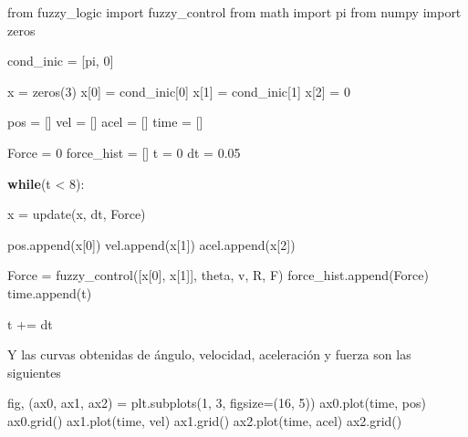 \documentclass[onecolumn]{article}
\newenvironment{Shaded}{}{}
\newcommand{\ControlFlowTok}[1]{\textcolor[rgb]{0.00,0.44,0.13}{\textbf{#1}}}
\newcommand{\DecValTok}[1]{\textcolor[rgb]{0.25,0.63,0.44}{#1}}
\newcommand{\FloatTok}[1]{\textcolor[rgb]{0.25,0.63,0.44}{#1}}
\newcommand{\ImportTok}[1]{#1}
\newcommand{\NormalTok}[1]{#1}
\newcommand{\OperatorTok}[1]{\textcolor[rgb]{0.40,0.40,0.40}{#1}}
\begin{document}
\begin{Shaded}
\begin{Highlighting}[]
\ImportTok{from}\NormalTok{ fuzzy_logic }\ImportTok{import}\NormalTok{ fuzzy_control}
\ImportTok{from}\NormalTok{ math }\ImportTok{import}\NormalTok{ pi}
\ImportTok{from}\NormalTok{ numpy }\ImportTok{import}\NormalTok{ zeros}

\NormalTok{cond_inic }\OperatorTok{=}\NormalTok{ [pi, }\DecValTok{0}\NormalTok{]}

\NormalTok{x }\OperatorTok{=}\NormalTok{ zeros(}\DecValTok{3}\NormalTok{)}
\NormalTok{x[}\DecValTok{0}\NormalTok{] }\OperatorTok{=}\NormalTok{ cond_inic[}\DecValTok{0}\NormalTok{]}
\NormalTok{x[}\DecValTok{1}\NormalTok{] }\OperatorTok{=}\NormalTok{ cond_inic[}\DecValTok{1}\NormalTok{]}
\NormalTok{x[}\DecValTok{2}\NormalTok{] }\OperatorTok{=} \DecValTok{0}

\NormalTok{pos }\OperatorTok{=}\NormalTok{ []}
\NormalTok{vel }\OperatorTok{=}\NormalTok{ []}
\NormalTok{acel }\OperatorTok{=}\NormalTok{ []}
\NormalTok{time }\OperatorTok{=}\NormalTok{ []}

\NormalTok{Force }\OperatorTok{=} \DecValTok{0}
\NormalTok{force_hist }\OperatorTok{=}\NormalTok{ []}
\NormalTok{t }\OperatorTok{=} \DecValTok{0}
\NormalTok{dt }\OperatorTok{=} \FloatTok{0.05}


\ControlFlowTok{while}\NormalTok{(t }\OperatorTok{<} \DecValTok{8}\NormalTok{):}

\NormalTok{    x }\OperatorTok{=}\NormalTok{ update(x, dt, Force)}

\NormalTok{    pos.append(x[}\DecValTok{0}\NormalTok{])}
\NormalTok{    vel.append(x[}\DecValTok{1}\NormalTok{])}
\NormalTok{    acel.append(x[}\DecValTok{2}\NormalTok{])}

\NormalTok{    Force }\OperatorTok{=}\NormalTok{ fuzzy_control([x[}\DecValTok{0}\NormalTok{], x[}\DecValTok{1}\NormalTok{]], theta, v, R, F)}
\NormalTok{    force_hist.append(Force)}
\NormalTok{    time.append(t)}

\NormalTok{    t }\OperatorTok{+=}\NormalTok{ dt}
\end{Highlighting}
\end{Shaded}

Y las curvas obtenidas de ángulo, velocidad, aceleración y fuerza son
las siguientes

\begin{Shaded}
\begin{Highlighting}[]
\NormalTok{fig, (ax0, ax1, ax2) }\OperatorTok{=}\NormalTok{ plt.subplots(}\DecValTok{1}\NormalTok{, }\DecValTok{3}\NormalTok{, figsize}\OperatorTok{=}\NormalTok{(}\DecValTok{16}\NormalTok{, }\DecValTok{5}\NormalTok{))}
\NormalTok{ax0.plot(time, pos)}
\NormalTok{ax0.grid()}
\NormalTok{ax1.plot(time, vel)}
\NormalTok{ax1.grid()}
\NormalTok{ax2.plot(time, acel)}
\NormalTok{ax2.grid()}
\end{Highlighting}
\end{Shaded}
\end{document}
